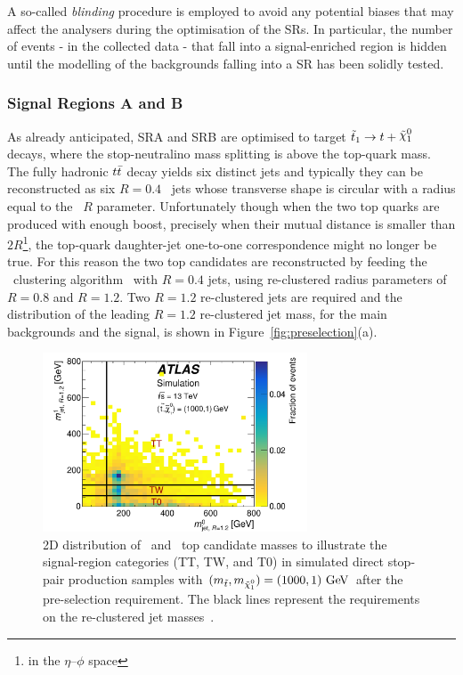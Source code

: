 			A so-called \emph{blinding} procedure is employed to avoid any potential biases that may affect the analysers during the optimisation of the \acp{SR}. In particular, the number of events - in the collected data - that fall into a signal-enriched region is hidden until the modelling of the backgrounds falling into a \ac{SR} has been solidly tested.%
			
			


			\subsubsection*{Signal Regions A and B}

				As already anticipated, SRA and SRB are optimised to target $\stopone \to t + \ninoone$ decays, where the stop-neutralino mass splitting is above the top-quark mass. The fully hadronic $t\bar{t}$ decay yields six distinct jets and typically they can be reconstructed as six $R=0.4$ \antikt\ jets whose transverse shape is circular with a radius equal to the \antikt\ $R$ parameter. Unfortunately though when the two top quarks are produced with enough boost, precisely when their mutual distance is smaller than $2R$\footnote{in the $\eta$--$\phi$ space}, the top-quark daughter-jet one-to-one correspondence might no longer be true. For this reason the two top candidates are reconstructed by feeding the \antikt\ clustering algorithm~\cite{Antikt2008} with $R=0.4$ jets, using re-clustered radius parameters of $R=0.8$ and $R=1.2$. Two $R=1.2$ re-clustered jets are required and the distribution of the leading $R=1.2$ re-clustered jet mass, for the main backgrounds and the signal, is shown in Figure~\ref{fig:preselection}(a).

				\begin{figure}[!htb]
				  \begin{center}
				   \includegraphics[width=0.7\textwidth]{figures/stop/SRA/CategoryDefs}
				   \caption{2D distribution of \mantikttwelvezero\ and \mantikttwelveone\ top candidate masses to illustrate the signal-region categories (TT, TW, and T0) in simulated direct stop-pair production samples with $(m_{\stop},m_{\ninoone})=(1000,1) \GeV$ after the pre-selection requirement. The black lines represent the requirements on the re-clustered jet masses~\cite{stop0L}.}
				   \label{fig:categories}
				  \end{center}
				\end{figure}

